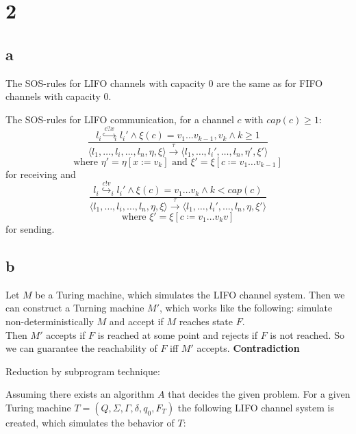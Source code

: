 \documentclass[11pt]{article}
\begin{document}
	\section{2}
	
	\subsection{a}
	
	The SOS-rules for LIFO channels with capacity 0 are the same as for FIFO channels with capacity 0.
	
	The SOS-rules for LIFO communication, for a channel $c$ with $cap(c) \ge 1$:\\
	
	$$\frac{l_i \stackrel{c?x}{\hookrightarrow}_i l_i' \land \xi(c) = v_1\dots v_{k-1},v_k \land k \ge 1}{\langle l_1, \dots, l_i,\dots, l_n, \eta,\xi \rangle \xrightarrow{\tau} \langle l_1, \dots, l_i',\dots, l_n, \eta',\xi' \rangle}  $$
	$$\text{where }\eta' = \eta[x:=v_k]\text{ and }\xi' = \xi[c\coloneqq v_1\dots v_{k-1}]$$
	for receiving and
	$$\frac{l_i \stackrel{c!v}{\hookrightarrow}_i l_i' \land \xi(c) = v_1\dots v_k \land k < cap(c)}{\langle l_1, \dots, l_i,\dots, l_n, \eta,\xi \rangle \xrightarrow{\tau} \langle l_1, \dots, l_i',\dots, l_n, \eta,\xi' \rangle}$$
	$$\text{where }\xi' = \xi[c\coloneqq v_1\dots v_{k} v]$$
	for sending.
	
	\subsection{b}
	
	Let $M$ be a Turing machine, which simulates the LIFO channel system. Then we can construct a Turning machine $M'$, which works like the following: simulate non-deterministically $M$ and accept if $M$ reaches state $F$.\\
	Then $M'$ accepts if $F$ is reached at some point and rejects if $F$ is not reached. So we can guarantee the reachability of $F$ iff $M'$ accepts. \textbf{Contradiction}
	
	
	
	Reduction by subprogram technique:
	
	Assuming there exists an algorithm $A$ that decides the given problem.
	For a given Turing machine $T = (Q, \Sigma, \Gamma, \delta, q_0, F_T)$ the following LIFO channel system is created, which simulates the behavior of $T$:
	
\end{document}
